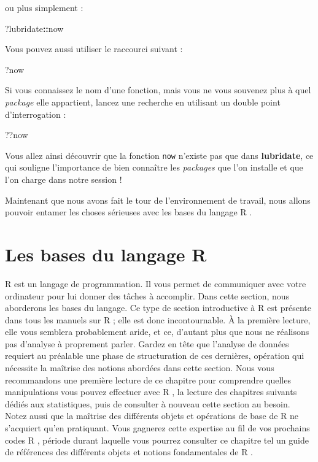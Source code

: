 \documentclass[
  11pt,
  french,
]{book}
\makeatletter
\newenvironment{Shaded}{\begin{snugshade}}{\end{snugshade}}
\newcommand{\NormalTok}[1]{#1}
\newcommand{\OperatorTok}[1]{\textcolor[rgb]{0.81,0.36,0.00}{\textbf{#1}}}
\newenvironment{kframe}{%
\medskip{}
\setlength{\fboxsep}{.8em}
 \def\at@end@of@kframe{}%
 \ifinner\ifhmode%
  \def\at@end@of@kframe{\end{minipage}}%
  \begin{minipage}{\columnwidth}%
 \fi\fi%
 \def\FrameCommand##1{\hskip\@totalleftmargin \hskip-\fboxsep
 \colorbox{shadecolor}{##1}\hskip-\fboxsep
     \hskip-\linewidth \hskip-\@totalleftmargin \hskip\columnwidth}%
 \MakeFramed {\advance\hsize-\width
   \@totalleftmargin\z@ \linewidth\hsize
   \@setminipage}}%
 {\par\unskip\endMakeFramed%
 \at@end@of@kframe}
\renewenvironment{Shaded}{\begin{kframe}}{\end{kframe}}
\makeatother
\begin{document}
ou plus simplement :

\begin{Shaded}
\begin{Highlighting}[]
\NormalTok{?lubridate}\OperatorTok{::}\NormalTok{now}
\end{Highlighting}
\end{Shaded}

Vous pouvez aussi utiliser le raccourci suivant :

\begin{Shaded}
\begin{Highlighting}[]
\NormalTok{?now}
\end{Highlighting}
\end{Shaded}

Si vous connaissez le nom d'une fonction, mais vous ne vous souvenez plus à quel \emph{package} elle appartient, lancez une recherche en utilisant un double point d'interrogation :

\begin{Shaded}
\begin{Highlighting}[]
\NormalTok{??now}
\end{Highlighting}
\end{Shaded}

Vous allez ainsi découvrir que la fonction \texttt{now} n'existe pas que dans \textbf{lubridate}, ce qui souligne l'importance de bien connaître les \emph{packages} que l'on installe et que l'on charge dans notre session !

Maintenant que nous avons fait le tour de l'environnement de travail, nous allons pouvoir entamer les choses sérieuses avec les bases du langage R .

\hypertarget{sect013}{%
\section{Les bases du langage R}\label{sect013}}

R est un langage de programmation. Il vous permet de communiquer avec votre ordinateur pour lui donner des tâches à accomplir. Dans cette section, nous aborderons les bases du langage. Ce type de section introductive à R est présente dans tous les manuels sur R ; elle est donc incontournable. À la première lecture, elle vous semblera probablement aride, et ce, d'autant plus que nous ne réalisons pas d'analyse à proprement parler. Gardez en tête que l'analyse de données requiert au préalable une phase de structuration de ces dernières, opération qui nécessite la maîtrise des notions abordées dans cette section. Nous vous recommandons une première lecture de ce chapitre pour comprendre quelles manipulations vous pouvez effectuer avec R , la lecture des chapitres suivants dédiés aux statistiques, puis de consulter à nouveau cette section au besoin. Notez aussi que la maîtrise des différents objets et opérations de base de R ne s'acquiert qu'en pratiquant. Vous gagnerez cette expertise au fil de vos prochains codes R , période durant laquelle vous pourrez consulter ce chapitre tel un guide de références des différents objets et notions fondamentales de R .
\end{document}
